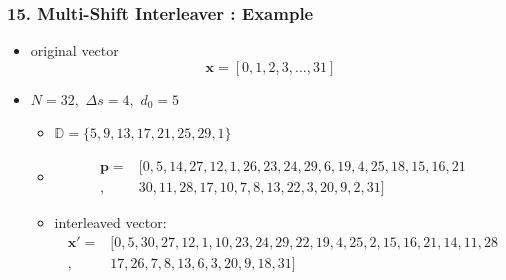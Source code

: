 \documentclass{beamer}  %
\begin{document}
\begin{frame}
\frametitle{15. Multi-Shift Interleaver : Example}
\begin{example}
\begin{itemize}

\item original vector $$\mathbf{x}=[0, 1, 2, 3,...,31]$$
\setlength\itemsep{2em}
\item $N=32, \,\, \Delta s =4, \,\, d_0=5$ 
\begin{itemize}
\item $\mathbb{D}=\{5, 9, 13, 17, 21, 25, 29, 1\}$

\item 
\begin{equation*}
\begin{split}
\mathbf{p}= &[ 0, 5, 14, 27, 12, 1, 26, 23, 24, 29, 6, 19, 4, 25, 18, 15, 16, 21\\,
 &30, 11, 28, 17, 10, 7, 8, 13, 22, 3, 20, 9, 2, 31]
\end{split}
\end{equation*}
 \item interleaved vector:
\begin{equation*}
\begin{split}
\mathbf{x}'=&[0,5,30,27,12,1,10,23,24,29,22,19, 4, 25 ,2, 15,16, 21, 14, 11, 28\\,&17,
  26, 7, 8, 13, 6, 3, 20, 9, 18, 31]
\end{split}
\end{equation*}
\end{itemize}



\end {itemize}
\end{example}
\end{frame}
\end{document}
